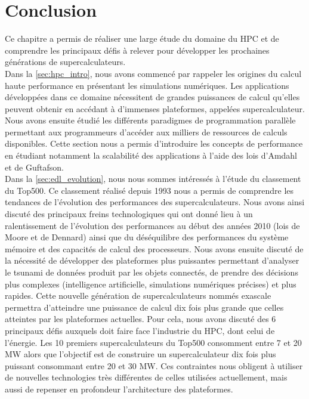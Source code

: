 \section{Conclusion}\label{sec:conclusion-hpc}


    Ce chapitre a permis de réaliser une large étude du domaine du HPC et de comprendre les principaux défis à relever pour développer les prochaines générations de supercalculateurs.\\
    
    
    Dans la \autoref{sec:hpc_intro}, nous avons commencé par rappeler les origines du calcul haute performance en présentant les simulations numériques. Les applications développées dans ce domaine nécessitent de grandes puissances de calcul qu'elles peuvent obtenir en accédant à d'immenses plateformes, appelées supercalculateur. Nous avons ensuite étudié les différents paradigmes de programmation parallèle permettant aux programmeurs d'accéder aux milliers de ressources de calculs disponibles. Cette section nous a permis d'introduire les concepts de performance en étudiant notamment la scalabilité des applications à l'aide des lois d'Amdahl et de Guftafson.\\
    
    
    Dans la \autoref{sec:edl_evolution}, nous nous sommes intéressés à l'étude du classement du Top500. Ce classement réalisé depuis 1993 nous a permis de comprendre les tendances de l'évolution des performances des supercalculateurs. Nous avons ainsi discuté des principaux freins technologiques qui ont donné lieu à un ralentissement de l'évolution des performances au début des années 2010 (lois de Moore et de Dennard) ainsi que du déséquilibre des performances du système mémoire et des capacités de calcul des processeurs. Nous avons ensuite discuté de la nécessité de développer des plateformes plus puissantes permettant d'analyser le tsunami de données produit par les objets connectés, de prendre des décisions plus complexes (intelligence artificielle, simulations numériques précises) et plus rapides. Cette nouvelle génération de supercalculateurs nommés exascale permettra d'atteindre une puissance de calcul dix fois plus grande que celles atteintes par les plateformes actuelles. Pour cela, nous avons discuté des 6 principaux défis auxquels doit faire face l'industrie du HPC, dont celui de l’énergie. Les 10 premiers supercalculateurs du Top500 consomment entre 7 et 20 MW alors que l’objectif est de construire un supercalculateur dix fois plus puissant consommant entre 20 et 30 MW. Ces contraintes nous obligent à utiliser de nouvelles technologies très différentes de celles utilisées actuellement, mais aussi de repenser en profondeur l'architecture des plateformes.\\
    
